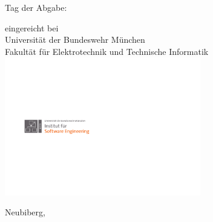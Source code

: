\begin{titlepage}
\begin{center}
\vspace{30pt}

Tag der Abgabe: \thePublicationDate\\ 

\vspace{30pt}

eingereicht bei\\
Universität der Bundeswehr München\\
Fakultät für Elektrotechnik und Technische Informatik\\
\vspace{15pt}
\includegraphics[width=242pt]{images/logos/UniBwM_ETTI_6_geschnitten.pdf}


\vspace{25pt}
Neubiberg, \thePublicationMY 
\end{center}
\end{titlepage}
\cleardoublepage